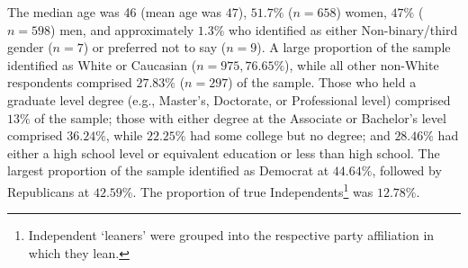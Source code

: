 \documentclass[
  12pt,
  letterpaper,
]{article}
\begin{document}
The median age was 46 (mean age was \(47\)), \(51.7\%\) (\(n = 658\))
women, \(47\%\) (\(n = 598\)) men, and approximately \(1.3\%\) who
identified as either Non-binary/third gender (\(n = 7\)) or preferred
not to say (\(n = 9\)). A large proportion of the sample identified as
White or Caucasian (\(n = 975, 76.65\%\)), while all other non-White
respondents comprised \(27.83\%\) (\(n = 297\)) of the sample. Those who
held a graduate level degree (e.g., Master's, Doctorate, or Professional
level) comprised \(13\%\) of the sample; those with either degree at the
Associate or Bachelor's level comprised \(36.24\%\), while \(22.25\%\)
had some college but no degree; and \(28.46\%\) had either a high school
level or equivalent education or less than high school. The largest
proportion of the sample identified as Democrat at \(44.64\%\), followed
by Republicans at \(42.59\%\). The proportion of true
Independents\footnote{Independent `leaners' were grouped into the
  respective party affiliation in which they lean.} was \(12.78\%\).
\end{document}
